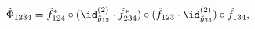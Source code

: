 \begin{equation}
  {\tilde \Phi}_{1234}
  = {\tilde f}^\ast_{124}
    \circ(\id^{(2)}_{{\tilde g}_{12}}\cdot {\tilde f}^\ast_{234})
    \circ({\tilde f}_{123}\cdot\id^{(2)}_{{\tilde g}_{34}})
    \circ{\tilde f}_{134},
\end{equation}

